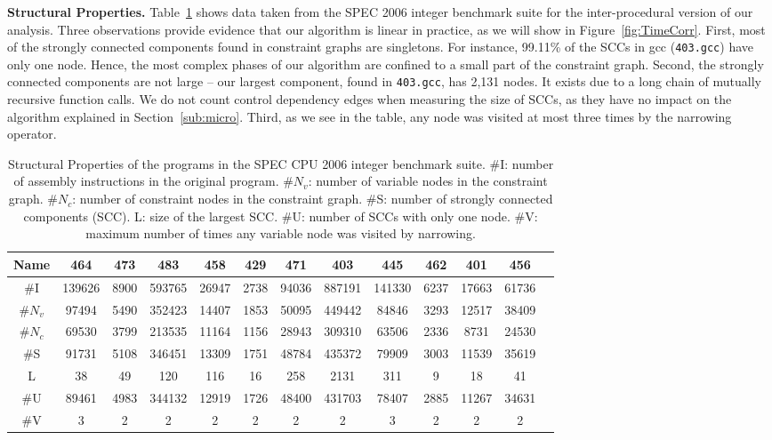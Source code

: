 \documentclass{llncs}
\begin{document}
\noindent
\textbf{Structural Properties.}
Table~\ref{tab:struct} shows data taken from the SPEC 2006 integer benchmark
suite for the inter-procedural version of our analysis.
Three observations provide evidence that our algorithm is linear in practice,
as we will show in Figure~\ref{fig:TimeCorr}.
First, most of the strongly connected components found in constraint graphs are
singletons.
For instance, 99.11\% of the SCCs in gcc (\texttt{403.gcc}) have only
one node.
Hence, the most complex phases of our algorithm are confined to a small part
of the constraint graph.
Second, the strongly connected components are not large -- our largest
component, found in \texttt{403.gcc}, has 2,131 nodes.
It exists due to a long chain of mutually recursive function calls.
We do not count control dependency edges when measuring the size of SCCs, as
they have no impact on the algorithm explained in Section~\ref{sub:micro}.
Third, as we see in the table, any node was visited at most three times by
the narrowing operator.

\begin{table}[t!]
\begin{center}
\begin{scriptsize}
\renewcommand{\tabcolsep}{0.1cm}
\begin{tabular}{|c|c|c|c|c|c|c|c|c|c|c|c|c|} \hline
Name	    & 464 &	473 & 483 & 458 & 429 & 471 & 403 & 445 & 462 & 401 & 456 \\ \hline
\#I  & 139626 & 8900 & 593765 & 26947 & 2738 & 94036 & 887191 & 141330 &  6237 & 17663 & 61736 \\ \hline
\#$N_v$ & 97494 & 5490 & 352423 & 14407 & 1853	 & 50095 & 449442 & 84846 & 3293 & 12517 & 38409 \\ \hline
\#$N_c$ & 69530 & 3799 & 213535 & 11164 & 1156 & 28943 & 309310 & 63506 & 2336 & 8731 & 24530 \\ \hline
\#S  & 91731 & 5108 & 346451 & 13309 & 1751 & 48784 & 435372 & 79909 & 3003 & 11539 & 35619 \\ \hline
L    & 38 & 49 & 120 & 116 & 16 & 258 & 2131 & 311 & 9 & 18 & 41  \\ \hline
\#U  & 89461 & 4983 & 344132 & 12919 & 1726 & 48400 & 431703 & 78407 & 2885 & 11267 & 34631 \\ \hline
\#V  & 3	& 2 & 2 & 2 & 2 & 2 & 2 & 3 & 2 & 2 & 2 \\ \hline
\end{tabular}
\end{scriptsize}
\end{center}
\caption{\label{tab:struct}Structural Properties of the programs in the SPEC CPU
2006 integer benchmark suite.
\#I: number of assembly instructions in the original program.
\#$N_v$: number of variable nodes in the constraint graph.
\#$N_c$: number of constraint nodes in the constraint graph.
\#S: number of strongly connected components (SCC).
L: size of the largest SCC.
\#U: number of SCCs with only one node.
\#V: maximum number of times any variable node was visited by narrowing.}
\end{table}%
\end{document}

